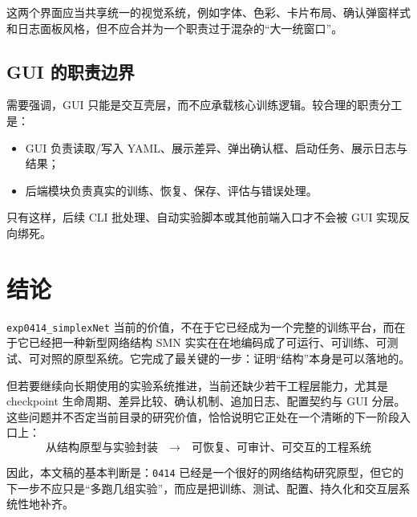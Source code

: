 \documentclass[11pt,fontset=none]{ctexart}
\begin{document}
这两个界面应当共享统一的视觉系统，例如字体、色彩、卡片布局、确认弹窗样式和日志面板风格，但不应合并为一个职责过于混杂的“大一统窗口”。

\subsection{GUI 的职责边界}

需要强调，GUI 只能是交互壳层，而不应承载核心训练逻辑。较合理的职责分工是：
\begin{itemize}[leftmargin=2em]
  \item GUI 负责读取/写入 YAML、展示差异、弹出确认框、启动任务、展示日志与结果；
  \item 后端模块负责真实的训练、恢复、保存、评估与错误处理。
\end{itemize}

只有这样，后续 CLI 批处理、自动实验脚本或其他前端入口才不会被 GUI 实现反向绑死。

\section{结论}

\texttt{exp0414\_simplexNet} 当前的价值，不在于它已经成为一个完整的训练平台，而在于它已经把一种新型网络结构 SMN 实实在在地编码成了可运行、可训练、可测试、可对照的原型系统。它完成了最关键的一步：证明“结构”本身是可以落地的。

但若要继续向长期使用的实验系统推进，当前还缺少若干工程层能力，尤其是 checkpoint 生命周期、差异比较、确认机制、追加日志、配置契约与 GUI 分层。这些问题并不否定当前目录的研究价值，恰恰说明它正处在一个清晰的下一阶段入口上：
\[
\text{从结构原型与实验封装} \quad \longrightarrow \quad \text{可恢复、可审计、可交互的工程系统}
\]

因此，本文稿的基本判断是：\texttt{0414} 已经是一个很好的网络结构研究原型，但它的下一步不应只是“多跑几组实验”，而应是把训练、测试、配置、持久化和交互层系统性地补齐。
\end{document}
